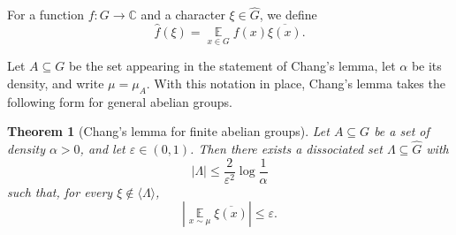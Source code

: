 \documentclass[11pt,reqno]{amsart}
\theoremstyle{plain}
\newtheorem{thm}{Theorem}[section]
\theoremstyle{remark}
\begin{document}
For a function $f:G\to\mathbb C$ and a character $\xi\in\widehat G$, we define
$$
\widehat f(\xi)
=
\mathop{\mathbb E}\limits_{x\in G} f(x)\overline{\xi(x)}.
$$

Let $A\subseteq G$ be the set appearing in the statement of Chang's lemma, let
$\alpha$ be its density, and write $\mu=\mu_A$.
With this notation in place, Chang's lemma takes the following form for general abelian groups.

\begin{thm}[Chang's lemma for finite abelian groups]\label{Chang-general}
Let $A\subseteq G$ be a set of density $\alpha>0$, and let
$\varepsilon\in(0,1)$. Then there exists a dissociated set
$\Lambda\subseteq\widehat G$ with
$$
|\Lambda|\le \frac{2}{\varepsilon^2}\log\frac{1}{\alpha}
$$
such that, for every $\xi\notin\langle\Lambda\rangle$,
\begin{equation}\label{eqchang-general}
\left|
\mathop{\mathbb E}\limits_{x\sim\mu}\overline{\xi(x)}
\right|
\le \varepsilon.
\end{equation}
\end{thm}
\end{document}
